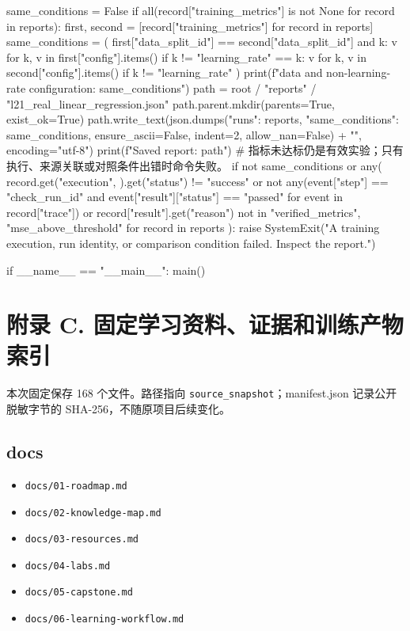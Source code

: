 \documentclass[UTF8,zihao=-4,fontset=fandol]{ctexart}
\begin{document}
\begin{Code}
    same_conditions = False
    if all(record["training_metrics"] is not None for record in reports):
        first, second = [record["training_metrics"] for record in reports]
        same_conditions = (
            first["data_split_id"] == second["data_split_id"]
            and {k: v for k, v in first["config"].items() if k != "learning_rate"}
            == {k: v for k, v in second["config"].items() if k != "learning_rate"}
        )
    print(f"\nSame data and non-learning-rate configuration: {same_conditions}")
    path = root / "reports" / "l21_real_linear_regression.json"
    path.parent.mkdir(parents=True, exist_ok=True)
    path.write_text(json.dumps({"runs": reports, "same_conditions": same_conditions},
                               ensure_ascii=False, indent=2, allow_nan=False) + "\n", encoding="utf-8")
    print(f"Saved report: {path}")
    # 指标未达标仍是有效实验；只有执行、来源关联或对照条件出错时命令失败。
    if not same_conditions or any(
        record.get("execution", {}).get("status") != "success"
        or not any(event["step"] == "check_run_id" and event["result"]["status"] == "passed"
                   for event in record["trace"])
        or record["result"].get("reason") not in {"verified_metrics", "mse_above_threshold"}
        for record in reports
    ):
        raise SystemExit("A training execution, run identity, or comparison condition failed. Inspect the report.")


if __name__ == "__main__":
    main()
\end{Code}

\section{附录 C. 固定学习资料、证据和训练产物索引}
本次固定保存 168 个文件。路径指向 \nolinkurl{source_snapshot}；manifest.json 记录公开脱敏字节的 SHA-256，不随原项目后续变化。

\subsection{docs}
\begin{itemize}
\item \nolinkurl{docs/01-roadmap.md}
\item \nolinkurl{docs/02-knowledge-map.md}
\item \nolinkurl{docs/03-resources.md}
\item \nolinkurl{docs/04-labs.md}
\item \nolinkurl{docs/05-capstone.md}
\item \nolinkurl{docs/06-learning-workflow.md}
\end{itemize}
\end{document}
